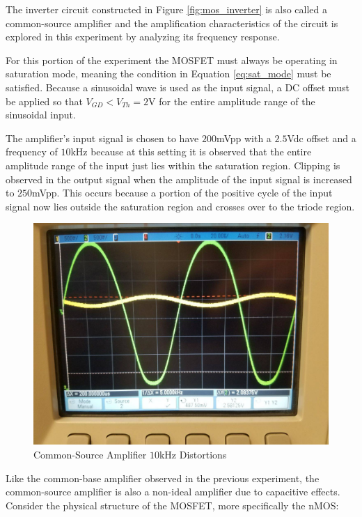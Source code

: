 The inverter circuit constructed in Figure \ref{fig:mos_inverter} is also called a common-source amplifier and the amplification characteristics of the circuit is explored in this experiment by analyzing its frequency response.

For this portion of the experiment the MOSFET must always be operating in saturation mode, meaning the condition in Equation \ref{eq:sat_mode} must be satisfied. Because a sinusoidal wave is used as the input signal, a DC offset must be applied so that $V_{GD} < V_{Th} = 2$\si{\volt} for the entire amplitude range of the sinusoidal input. 

The amplifier's input signal is chosen to have $200$\si{\milli\volt}pp with a $2.5$\si{\volt}dc offset and a frequency of $10$\si{\kilo\hertz} because at this setting it is observed that the entire amplitude range of the input just lies within the saturation region. Clipping is observed in the output signal when the amplitude of the input signal is increased to $250$\si{\milli\volt}pp. This occurs because a portion of the positive cycle of the input signal now lies outside the saturation region and crosses over to the triode region. 

\FloatBarrier
\begin{figure}[h!]
	\centering
	\includegraphics[scale=0.25]{./images/amplifier_clamping.jpeg}
	\caption{Common-Source Amplifier $10$\si{\kilo\hertz} Distortions}
	\label{fig:amplifier_clipping}
\end{figure}
\FloatBarrier

Like the common-base amplifier observed in the previous experiment, the common-source amplifier is also a non-ideal amplifier due to capacitive effects. Consider the physical structure of the MOSFET, more specifically the nMOS:


